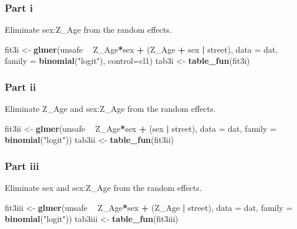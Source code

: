 \documentclass[]{article}
\newenvironment{Shaded}{\begin{snugshade}}{\end{snugshade}}
\newcommand{\KeywordTok}[1]{\textcolor[rgb]{0.13,0.29,0.53}{\textbf{#1}}}
\newcommand{\DataTypeTok}[1]{\textcolor[rgb]{0.13,0.29,0.53}{#1}}
\newcommand{\StringTok}[1]{\textcolor[rgb]{0.31,0.60,0.02}{#1}}
\newcommand{\OperatorTok}[1]{\textcolor[rgb]{0.81,0.36,0.00}{\textbf{#1}}}
\newcommand{\NormalTok}[1]{#1}
\begin{document}
\subsubsection{Part i}\label{part-i-1}

Eliminate sex:Z\_Age from the random effects.

\begin{Shaded}
\begin{Highlighting}[]
\NormalTok{fit3i <-}\StringTok{ }\KeywordTok{glmer}\NormalTok{(unsafe }\OperatorTok{~}\StringTok{ }\NormalTok{Z_Age}\OperatorTok{*}\NormalTok{sex }\OperatorTok{+}\StringTok{ }\NormalTok{(Z_Age }\OperatorTok{+}\StringTok{ }\NormalTok{sex }\OperatorTok{|}\StringTok{ }\NormalTok{street), }
               \DataTypeTok{data =}\NormalTok{ dat, }\DataTypeTok{family =} \KeywordTok{binomial}\NormalTok{(}\StringTok{"logit"}\NormalTok{), }\DataTypeTok{control=}\NormalTok{cl1)}
\NormalTok{tab3i <-}\StringTok{ }\KeywordTok{table_fun}\NormalTok{(fit3i)}
\end{Highlighting}
\end{Shaded}

\subsubsection{Part ii}\label{part-ii-1}

Eliminate Z\_Age and sex:Z\_Age from the random effects.

\begin{Shaded}
\begin{Highlighting}[]
\NormalTok{fit3ii <-}\StringTok{ }\KeywordTok{glmer}\NormalTok{(unsafe }\OperatorTok{~}\StringTok{ }\NormalTok{Z_Age}\OperatorTok{*}\NormalTok{sex }\OperatorTok{+}\StringTok{ }\NormalTok{(sex }\OperatorTok{|}\StringTok{ }\NormalTok{street), }
                \DataTypeTok{data =}\NormalTok{ dat, }\DataTypeTok{family =} \KeywordTok{binomial}\NormalTok{(}\StringTok{"logit"}\NormalTok{))}
\NormalTok{tab3ii <-}\StringTok{ }\KeywordTok{table_fun}\NormalTok{(fit3ii)}
\end{Highlighting}
\end{Shaded}

\subsubsection{Part iii}\label{part-iii-1}

Eliminate sex and sex:Z\_Age from the random effects.

\begin{Shaded}
\begin{Highlighting}[]
\NormalTok{fit3iii <-}\StringTok{ }\KeywordTok{glmer}\NormalTok{(unsafe }\OperatorTok{~}\StringTok{ }\NormalTok{Z_Age}\OperatorTok{*}\NormalTok{sex }\OperatorTok{+}\StringTok{ }\NormalTok{(Z_Age }\OperatorTok{|}\StringTok{ }\NormalTok{street), }
                 \DataTypeTok{data =}\NormalTok{ dat, }\DataTypeTok{family =} \KeywordTok{binomial}\NormalTok{(}\StringTok{"logit"}\NormalTok{))}
\NormalTok{tab3iii <-}\StringTok{ }\KeywordTok{table_fun}\NormalTok{(fit3iii)}
\end{Highlighting}
\end{Shaded}
\end{document}
